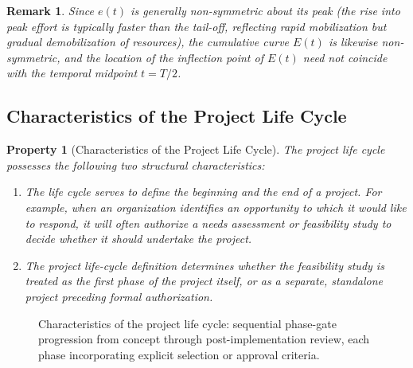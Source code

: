 \documentclass[12pt, a4paper]{report}
\theoremstyle{engnotes}
\newtheorem{property}{Property}[section]
\newtheorem{remark}{Remark}[section]
\begin{document}
\begin{remark}
    Since $e(t)$ is generally non-symmetric about its peak (the rise into peak effort is typically faster than the tail-off, reflecting rapid mobilization but gradual demobilization of resources), the cumulative curve $E(t)$ is likewise non-symmetric, and the location of the inflection point of $E(t)$ need not coincide with the temporal midpoint $t = T/2$.
\end{remark}

\subsection{Characteristics of the Project Life Cycle}
\label{subsec:life_cycle_characteristics}

\begin{property}[Characteristics of the Project Life Cycle]\label{pty:life_cycle_characteristics}
    The project life cycle possesses the following two structural characteristics:
    \begin{enumerate}
        \item The life cycle serves to define the \emph{beginning} and the \emph{end} of a project. For example, when an organization identifies an opportunity to which it would like to respond, it will often authorize a needs assessment or feasibility study to decide whether it should undertake the project.
        \item The project life-cycle definition determines whether the feasibility study is treated as the first phase of the project itself, or as a separate, standalone project preceding formal authorization.
    \end{enumerate}
\end{property}

\begin{figure}[H]
    \centering
    \caption{Characteristics of the project life cycle: sequential phase-gate progression from concept through post-implementation review, each phase incorporating explicit selection or approval criteria.}
    \label{fig:life_cycle_phase_gate}
\end{figure}
\end{document}
